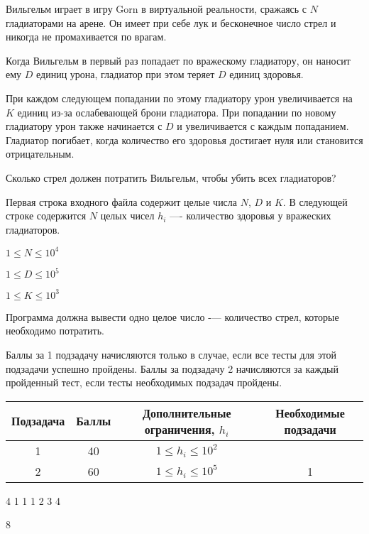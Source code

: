 
Вильгельм играет в игру Gorn в виртуальной реальности, сражаясь с $N$ гладиаторами на арене. Он имеет при себе лук и бесконечное число стрел и никогда не промахивается по врагам. 

Когда Вильгельм в первый раз попадает по вражескому гладиатору, он наносит ему $D$ единиц урона, гладиатор при этом теряет $D$ единиц здоровья. 

При каждом следующем попадании по этому гладиатору урон увеличивается на $K$ единиц из-за ослабевающей брони гладиатора. При попадании по новому гладиатору урон также начинается с $D$ и увеличивается с каждым попаданием. Гладиатор погибает, когда количество его здоровья достигает нуля или становится отрицательным. 

Сколько стрел должен потратить Вильгельм, чтобы убить всех гладиаторов?


Первая строка входного файла содержит целые числа $N$, $D$ и $K$. В следующей строке содержится $N$ целых чисел $h_i$ —- количество здоровья у вражеских гладиаторов.

$1\leq N \leq 10^4$

$1\leq D \leq 10^5$

$1\leq K \leq 10^3$

\outputfmtSection

Программа должна вывести одно целое число -— количество стрел, которые необходимо потратить.

\markSection

Баллы за 1 подзадачу начисляются только в случае, если все тесты для этой подзадачи успешно пройдены. Баллы за подзадачу 2 начисляются за каждый пройденный тест, если тесты необходимых подзадач пройдены.

\begin{table}[H]
    \begin{center}
    \begin{tabular}{|c|c|c|c|}
    \hline
    Подзадача & Баллы & Дополнительные ограничения, $h_i$ & Необходимые подзадачи \\
    \hline
    1 & 40 & $1\leq h_i \leq 10^2$& \\
    \hline
    2 & 60 & $1\leq h_i \leq 10^5$ & 1 \\
    \hline
    
    \end{tabular}
    \end{center}
\end{table} 


\begin{myverbbox}[\small]{\vinput}
    4 1 1
    1 2 3 4
\end{myverbbox}
\begin{myverbbox}[\small]{\voutput}
    8
\end{myverbbox}
